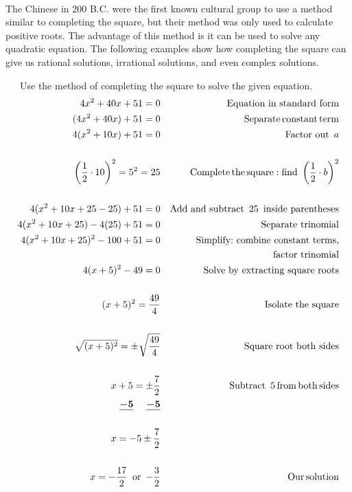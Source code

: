 ~\pp

{} The Chinese in 200 B.C. were the first known
cultural group to use a method similar to completing the square, but their
method was only used to calculate positive roots.  The advantage of this method is it can be used to solve any quadratic
equation. The following examples show how completing the square can give us
rational solutions, irrational solutions, and even complex solutions.

\begin{example}~~~Use the method of completing the square to solve the given equation.
  \begin{eqnarray*}
    4 x^2 + 40 x + 51 = 0 &  & \text{Equation~in~standard~form}\\
    (4 x^2 + 40 x)+ 51=0 &  & \operatorname{Separate} \operatorname{constant} \operatorname{term}\\
    4(x^2 + 10 x) + 51=0 &  & \operatorname{Factor~out~} a\\
    &&\\
		\left( \frac{1}{2} \cdot 10 \right)^2 = 5^2 = 25 &  & \operatorname{Complete}
    \operatorname{the} \operatorname{square} : \text{find~}\left( \frac{1}{2} \cdot b \right)^2\\
    &&\\
		4(x^2 + 10 x+25-25) +51=0 &  & \operatorname{Add~and~subtract~} 25
    \operatorname{~inside~parentheses}\\
    4(x^2 + 10 x+25)-4(25) +51=0 &  & \operatorname{Separate~trinomial}\\
    4(x^2 + 10 x+25)^2 -100+51= 0 &  & \text{Simplify:~combine~constant~terms,}\\
		& & ~~~\text{factor~trinomial}\\
		4(x + 5)^2 -49= 0&&\operatorname{Solve~by~extracting~square~roots}\\
    &&\\
		(x + 5)^2= \frac{49}{4}&&\operatorname{Isolate~the~square}\\
		&&\\
		\sqrt[]{(x + 5)^2} = \pm~ \sqrt[]{\frac{49}{4}} &  & \operatorname{Square~root~both~sides}\\
    &&\\
		x + 5 = \pm \frac{7}{2} &  & \operatorname{Subtract~} 5 \operatorname{from} \operatorname{both}
    \operatorname{sides}\\
    \boldsymbol{\underline{- 5}~~~~\underline{- 5}}  &  & \\
    &&\\
		x = - 5 \pm \frac{7}{2} &  &\\
    &&\\
		x = -\frac{17}{2} \operatorname{~or~} -\frac{3}{2} &  & \operatorname{Our} \operatorname{solution}
  \end{eqnarray*}
\end{example}

